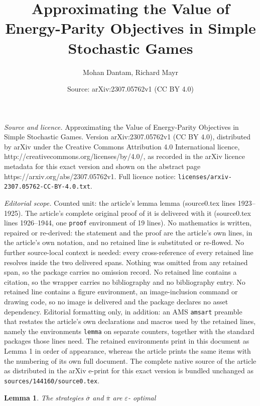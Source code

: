 \documentclass[10pt,a4paper]{amsart}
\title{Approximating the Value of Energy-Parity Objectives in Simple Stochastic Games}
\author{Mohan Dantam, Richard Mayr}
\date{Source: arXiv:2307.05762v1 (CC BY 4.0)}
\newtheorem{lemma}{Lemma}
\newcommand{\eps}{\varepsilon}
\begin{document}
\maketitle

\noindent\emph{Source and licence.} Approximating the Value of Energy-Parity Objectives in Simple Stochastic Games. Version arXiv:2307.05762v1 (CC BY 4.0), distributed by arXiv under the Creative Commons Attribution 4.0 International licence, http://creativecommons.org/licenses/by/4.0/, as recorded in the arXiv licence metadata for this exact version and shown on the abstract page https://arxiv.org/abs/2307.05762v1. Full licence notice: \texttt{licenses/arxiv-2307.05762-CC-BY-4.0.txt}.\par\smallskip

\noindent\textit{Editorial scope.} Counted unit: the article's lemma lemma (source0.tex lines 1923--1925). The article's complete original proof of it is delivered with it (source0.tex lines 1926--1944, one \texttt{proof} environment of 19 lines). No mathematics is written, repaired or re-derived: the statement and the proof are the article's own lines, in the article's own notation, and no retained line is substituted or re-flowed.  No further source-local context is needed: every cross-reference of every retained line resolves inside the two delivered spans.  Nothing was omitted from any retained span, so the package carries no omission record.  No retained line contains a citation, so the wrapper carries no bibliography and no bibliography entry.  No retained line contains a figure environment, an image-inclusion command or drawing code, so no image is delivered and the package declares no asset dependency.  Editorial formatting only, in addition: an AMS \texttt{amsart} preamble that restates the article's own declarations and macros used by the retained lines, namely the environments \texttt{lemma} on separate counters, together with the standard packages those lines need.  The retained environments print in this document as Lemma 1 in order of appearance, whereas the article prints the same items with the numbering of its own full document.  The complete native source of the article as distributed in the arXiv e-print for this exact version is bundled unchanged as \texttt{sources/144160/source0.tex}.
  \begin{lemma}
  The strategies $\overline{\sigma}$ and $\overline{\pi}$ are $\eps$- optimal
  \end{lemma}
\end{document}
